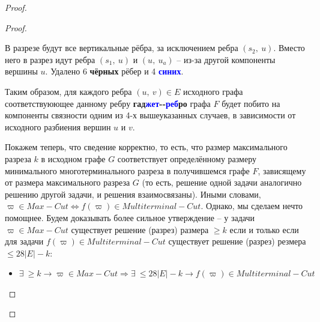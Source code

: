 \documentclass[a4paper,12pt]{article}
\begin{document}
\begin{proof}
\begin{proof}
\begin{enumerate}
            \begin{center}
            \end{center}
            В разрезе будут все вертикальные рёбра, за исключением ребра $(s_2,\ u)$. Вместо него в разрез идут ребра $(s_1,\ u)$ и $(u,\ u_a)$ -- из-за другой компоненты вершины $u$. Удалено 6 \textbf{чёрных} рёбер и 4 \textbf{\textcolor{blue}{синих}}.
        \end{enumerate}
        Таким образом, для каждого ребра $(u,\ v) \in E$ исходного графа соответствуюющее данному ребру  \textbf{гад}\textbf{\textcolor{blue}{жет}}\textbf{-}\textbf{-}\textbf{\textcolor{blue}{реб}}\textbf{ро} графа $F$ будет побито на компоненты связности одним из 4-х вышеуказанных случаев, в зависимости от исходного разбиения вершин $u$ и $v$.
        
        Покажем теперь, что сведение корректно, то есть, что размер максимального разреза $k$ в исходном графе $G$ соответствует определённому размеру минимального многотерминального разреза в получившемся графе $F$, зависящему от размера максимального разреза $G$ (то есть, решение одной задачи аналогично решению другой задачи, и решения взаимосвязаны). Иными словами, $\varpi \in Max-Cut \Longleftrightarrow f(\varpi) \in Multiterminal-Cut$. Однако, мы сделаем нечто помощнее. Будем доказывать более сильное утверждение -- у задачи $\varpi \in Max-Cut$ существует решение (разрез) размера $\geqslant k$ если и только если для задачи $f(\varpi) \in Multiterminal-Cut$ существует решение (разрез) резмера $\leqslant 28|E| - k$:
        \begin{itemize}
            \item $\exists\ \geqslant k\to\varpi \in Max-Cut \Longrightarrow \exists\ \leqslant 28|E| - k \to f(\varpi) \in Multiterminal-Cut$
            

\end{itemize}
\end{proof}
\end{proof}
\end{document}
